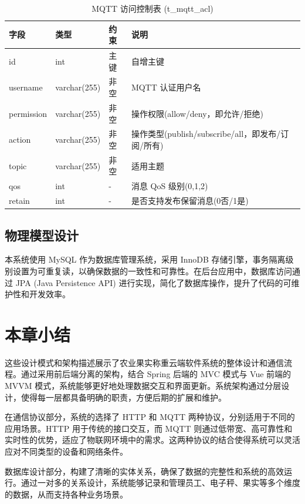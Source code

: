 \begin{table}[H]
\centering
\caption{MQTT 访问控制表 (t\_mqtt\_acl)}
\begin{tabular}{|l|l|l|l|}
\hline
字段 & 类型 & 约束 & 说明 \\
\hline
id & int & 主键 & 自增主键 \\
username & varchar(255) & 非空 & MQTT 认证用户名 \\
permission & varchar(255) & 非空 & 操作权限(allow/deny，即允许/拒绝) \\
action & varchar(255) & 非空 & 操作类型(publish/subscribe/all，即发布/订阅/所有) \\
topic & varchar(255) & 非空 & 适用主题 \\
qos & int & - & 消息 QoS 级别(0,1,2) \\
retain & int & - & 是否支持发布保留消息(0否/1是) \\
\hline
\end{tabular}
\end{table}

\subsection{物理模型设计}

本系统使用 MySQL 作为数据库管理系统，采用 InnoDB 存储引擎，事务隔离级别设置为可重复读，以确保数据的一致性和可靠性。在后台应用中，数据库访问通过 JPA (Java Persistence API) 进行实现，简化了数据库操作，提升了代码的可维护性和开发效率。

\section{本章小结}

这些设计模式和架构描述展示了农业果实称重云端软件系统的整体设计和通信流程。通过采用前后端分离的架构，结合 Spring 后端的 MVC 模式与 Vue 前端的 MVVM 模式，系统能够更好地处理数据交互和界面更新。系统架构通过分层设计，使得每一层都具备明确的职责，方便后期的扩展和维护。

在通信协议部分，系统的选择了 HTTP 和 MQTT 两种协议，分别适用于不同的应用场景。HTTP 用于传统的接口交互，而 MQTT 则通过低带宽、高可靠性和实时性的优势，适应了物联网环境中的需求。这两种协议的结合使得系统可以灵活应对不同类型的设备和网络条件。

数据库设计部分，构建了清晰的实体关系，确保了数据的完整性和系统的高效运行。通过一对多的关系设计，系统能够记录和管理员工、电子秤、果实等多个维度的数据，从而支持各种业务场景。


